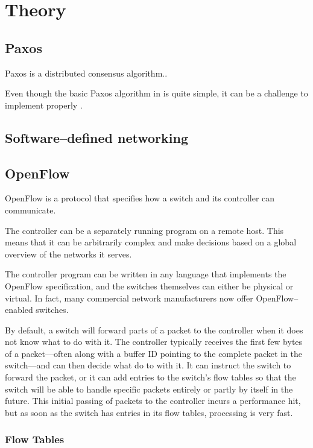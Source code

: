 \chapter{Theory}

\section{Paxos}
Paxos is a distributed consensus algorithm..

Even though the basic Paxos algorithm in \cite{Lam01} is quite simple, it can be
a challenge to implement properly \cite{Chandra:2007:PML:1281100.1281103}.
\section{Software--defined networking}

\section{OpenFlow}
OpenFlow is a protocol that specifies how a switch and its controller can
communicate.

The controller can be a separately running program on a remote host. This
means that it can be arbitrarily complex and make decisions based on a
global overview of the networks it serves.

The controller program can be written in any language that implements the
OpenFlow specification, and the switches themselves can either be physical
or virtual.  In fact, many commercial network manufacturers now offer
OpenFlow--enabled switches.

By default, a switch will forward parts of a packet to the controller when
it does not know what to do with it.  The controller typically receives the
first few bytes of a packet---often along with a buffer ID pointing to the
complete packet in the switch---and can then decide what do to with it.  It
can instruct the switch to forward the packet, or it can add entries to the
switch's flow tables so that the switch will be able to handle specific
packets entirely or partly by itself in the future.  This initial passing of
packets to the controller incurs a performance hit, but as soon as the
switch has entries in its flow tables, processing is very fast.

\subsection{Flow Tables}
